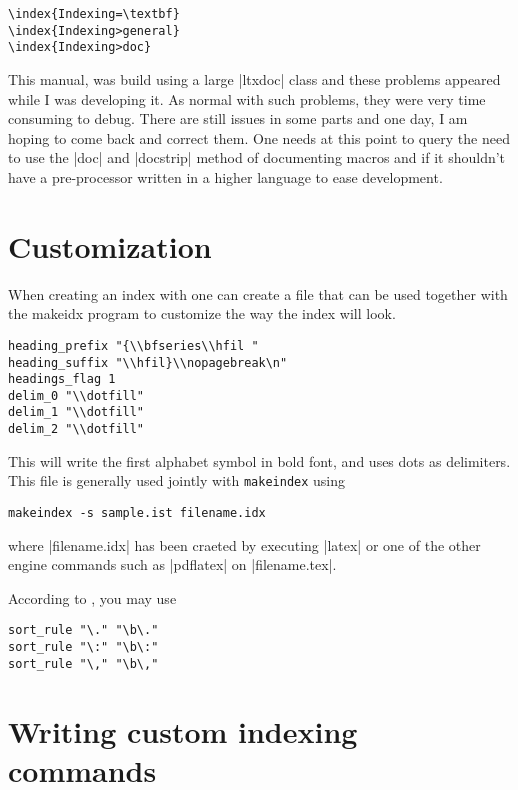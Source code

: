\begin{verbatim}
\index{Indexing=\textbf}
\index{Indexing>general}
\index{Indexing>doc}
\end{verbatim}

This manual, was build using a large |ltxdoc| class and these problems appeared while I was developing it. As normal with such problems, they were very time consuming to debug. There are still issues in some parts and one day, I am hoping to come back and correct them. One needs at this point to query the need to use the |doc| and |docstrip| method of documenting macros and if it shouldn't have a pre-processor written in a higher language to ease development. 

\section{Customization}

When creating an index with  one can create a  file that can be used together with the makeidx program to customize the way the index will look.

\begin{verbatim}
heading_prefix "{\\bfseries\\hfil "
heading_suffix "\\hfil}\\nopagebreak\n"
headings_flag 1
delim_0 "\\dotfill"
delim_1 "\\dotfill"
delim_2 "\\dotfill"
\end{verbatim}

This will write the first alphabet symbol in bold font, and uses dots as delimiters. This file is generally  used jointly with \texttt{makeindex} using

\verb|makeindex -s sample.ist filename.idx|

where |filename.idx| has been craeted by executing |latex| or one of the other engine commands such as |pdflatex| on |filename.tex|.


According to \citep{gabora}, you may use

\begin{verbatim}
sort_rule "\." "\b\."
sort_rule "\:" "\b\:"
sort_rule "\," "\b\,"
\end{verbatim}


\section{Writing custom indexing commands}

